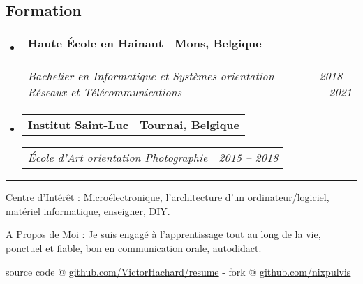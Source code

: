 \documentclass[10pt,letterpaper]{article}
\makeatletter
\newenvironment{indentsection}[1]
{\begin{list}{}
  {\setlength{\leftmargin}{#1}} \item[]
}
{\end{list}}
\newcommand{\headerrow}[2]
{\begin{tabular*}{\linewidth}{l@{\extracolsep{\fill}}r}
  #1 &
  #2 \\
\end{tabular*}}
\makeatother
\begin{document}
\subsection*{Formation}
\begin{itemize}
  \parskip=0.1em

  \item
  \headerrow
    {\textbf{Haute École en Hainaut}}
    {\textbf{Mons, Belgique}}
  \headerrow
    {\emph{Bachelier en Informatique et Systèmes orientation Réseaux et
    Télécommunications}}
    {\emph{2018 -- 2021}}
  \item
  \headerrow
    {\textbf{Institut Saint-Luc}}
    {\textbf{Tournai, Belgique}}
  \headerrow
    {\emph{École d'Art orientation Photographie}}
    {\emph{2015 -- 2018}}
\end{itemize}

\hrule
\begin{indentsection}{\parindent}
\begin{description*}
\item[Centre d'Intérêt :]
  Microélectronique, l'architecture d'un ordinateur/logiciel, matériel
  informatique, enseigner, DIY.
\item[A Propos de Moi :]
  Je suis engagé à l'apprentissage tout au long de la vie, ponctuel et fiable,
  bon en communication orale, autodidact.
\end{description*}
\end{indentsection}


\begin{center}
\footnotesize source code @
\href{http://www.github.com/VictorHachard/resume}
{github.com/VictorHachard/resume} - fork @
\href{http://www.github.com/nixpulvis}
{github.com/nixpulvis}
\end{center}
\end{document}
